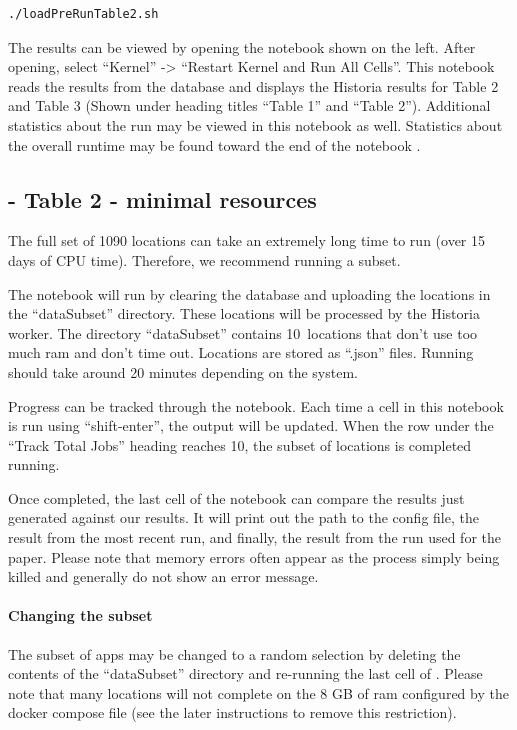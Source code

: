 \documentclass{article} %
\begin{document}
\begin{lstlisting}[language=bash]
    ./loadPreRunTable2.sh
\end{lstlisting}

The results can be viewed by opening the notebook  shown on the left.  After opening, select ``Kernel'' -> ``Restart Kernel and Run All Cells''.
This notebook reads the results from the database and displays the Historia results for Table 2 and Table 3 (Shown under heading titles ``Table 1'' and ``Table 2''). Additional statistics about the run may be viewed in this notebook as well. Statistics about the overall runtime may be found toward the end of the notebook .


\subsection{ - Table 2 - minimal resources}

\newcommand{\numsubset}{10}
The full set of 1090 locations can take an extremely long time to run (over 15 days of CPU time).  Therefore, we recommend running a subset.


The notebook  will run by clearing the database and uploading the locations in the ``dataSubset'' directory.  These locations will be processed by the Historia worker.  
The directory ``dataSubset'' contains \numsubset~locations that don't use too much ram and don't time out.  Locations are stored as ``.json'' files.
Running should take around 20 minutes depending on the system.

Progress can be tracked through the  notebook.  
Each time a cell in this notebook is run using ``shift-enter'', the output will be updated.
When the  row under the ``Track Total Jobs'' heading reaches \numsubset, the subset of locations is completed running.

Once completed, the last cell of the notebook  can compare the results just generated against our results.  It will print out the path to the config file, the result from the most recent run, and finally, the result from the run used for the paper.  Please note that memory errors often appear as the process simply being killed and generally do not show an error message.

\paragraph{Changing the subset} The subset of apps may be changed to a random selection by deleting the contents of the ``dataSubset'' directory and re-running the last cell of .  Please note that many locations will not complete on the 8 GB of ram configured by the docker compose file (see the later instructions to remove this restriction).  
\end{document}

